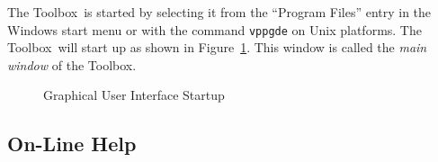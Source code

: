\documentclass[\pformat,12pt]{article}
\newcommand{\Toolbox}{Toolbox}
\newcommand{\vdmgde}{vppgde}
\begin{document}
The \Toolbox\ is started by selecting it from the ``Program Files''
entry in the Windows start menu or with the command {\tt \vdmgde}
 on Unix platforms. The \Toolbox\ 
will start up as shown in Figure~\ref{fig:startgui}. This window is
called the {\em main window\/} of the \Toolbox.


\begin{figure}[tbh]
\begin{center}
\caption{Graphical User Interface Startup}
\label{fig:startgui}
\end{center}
\end{figure}

\subsection{On-Line Help}
 
%
\end{document}
